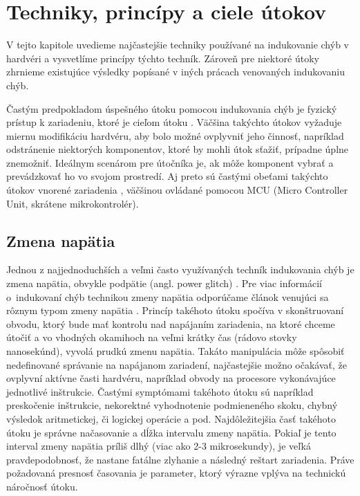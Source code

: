 \chapter{Techniky, princípy a ciele útokov}
\label{kap:teoria}

V tejto kapitole uvedieme najčastejšie techniky používané na indukovanie chýb v hardvéri a vysvetlíme princípy týchto techník. Zároveň pre niektoré útoky zhrnieme existujúce výsledky popísané v iných prácach venovaných indukovaniu chýb.

Častým predpokladom úspešného útoku pomocou indukovania chýb je fyzický prístup k zariadeniu, ktoré je cieľom útoku \cite{lowcost}. Väčšina takýchto útokov vyžaduje miernu modifikáciu hardvéru, aby bolo možné ovplyvniť jeho činnosť, napríklad odstránenie niektorých komponentov, ktoré by mohli útok sťažiť, prípadne úplne znemožniť. Ideálnym scenárom pre útočníka je, ak môže komponent vybrať a prevádzkovať ho vo svojom prostredí. Aj preto sú častými obeťami takýchto útokov vnorené zariadenia \cite{lowcost}, väčšinou ovládané pomocou MCU (Micro Controller Unit, skrátene mikrokontrolér).

\section{Zmena napätia} \label{kap1:sek:zmenaNapatia}
Jednou z najjednoduchších a veľmi často využívaných techník indukovania chýb je zmena napätia, obvykle podpätie (angl. power glitch) \cite{crowbars, vccOnTheCheap, crypto}. Pre viac informácií o~indukovaní chýb technikou zmeny napätia odporúčame článok venujúci sa rôznym typom zmeny napätia \cite{powerGlitch}. Princíp takéhoto útoku spočíva v skonštruovaní obvodu, ktorý bude mať kontrolu nad napájaním zariadenia, na ktoré chceme útočiť a vo vhodných okamihoch na veľmi krátky čas (rádovo stovky nanosekúnd), vyvolá prudkú zmenu napätia. Takáto manipulácia môže spôsobiť nedefinované správanie na napájanom zariadení, najčastejšie možno očakávať, že ovplyvní aktívne časti hardvéru, napríklad obvody na procesore vykonávajúce jednotlivé inštrukcie. Častými symptómami takéhoto útoku sú napríklad preskočenie inštrukcie, nekorektné vyhodnotenie podmieneného skoku, chybný výsledok aritmetickej, či logickej operácie a pod. Najdôležitejšia časť takéhoto útoku je správne načasovanie a dĺžka intervalu zmeny napätia. Pokiaľ je tento interval zmeny napätia príliš dlhý (viac ako 2-3 mikrosekundy), je veľká pravdepodobnosť, že nastane fatálne zlyhanie a následný reštart zariadenia. Práve požadovaná presnosť časovania je parameter, ktorý výrazne vplýva na technickú náročnosť útoku.


